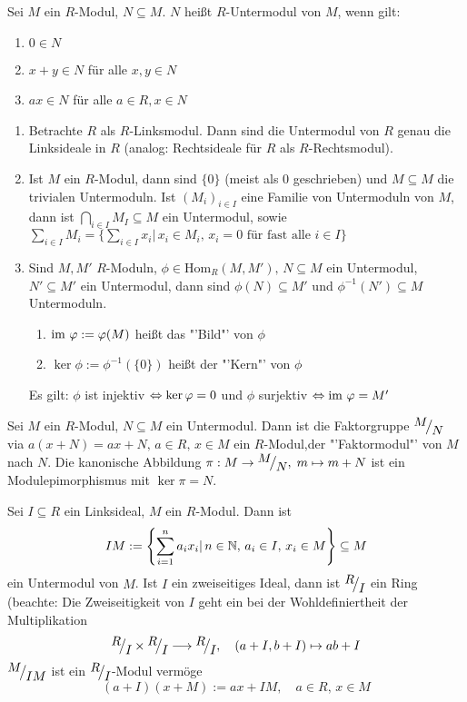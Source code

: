 \begin{df}
	Sei $M$ ein $R$-Modul, $N\subseteq M$. $N$ heißt $R$-Untermodul von $M$, wenn gilt:
	\begin{enumerate}[label= \alph*)]
		\item $0\in N$
		\item $x+y\in N$ für alle $x,y\in N$
		\item $ax\in N$ für alle $a\in R, x\in N$
	\end{enumerate}
\end{df}
\begin{bsp}
	\begin{enumerate}[label=\alph*)]
		\item Betrachte $R$ als $R$-Linksmodul. Dann sind die Untermodul von $R$ genau die Linksideale in $R$ (analog: Rechtsideale für $R$ als $R$-Rechtsmodul).
		\item Ist $M$ ein $R$-Modul, dann sind $\{0\}$ (meist als $0$ geschrieben) und $M\subseteq M$ die trivialen Untermoduln. Ist $(M_i)_{i\in I}$ eine Familie von Untermoduln von $M$, dann ist $\bigcap_{i\in I} M_I\subseteq M$ ein Untermodul, sowie $\sum_{i\in I} M_i = \{\sum_{i\in I} x_i|\, x_i \in M_i, \, x_i=0 \text{ für fast alle } i\in I\}$
		\item Sind $M, M'$ $R$-Moduln, $\phi\in \text{Hom}_R(M, M'), \, N\subseteq M$ ein Untermodul, $N' \subseteq M'$ ein Untermodul, dann sind $\phi(N) \subseteq M'$ und $\phi^{-1}(N') \subseteq M$ Untermoduln. 
		\begin{enumerate}
			\item[] $\operatorname{\text{im}\,} \varphi:= \varphi(M)$ heißt das "'Bild"' von $\phi$
			\item[] $\ker \phi:= \phi^{-1}(\{0\})$ heißt der "'Kern"' von $\phi$
		\end{enumerate}
	Es gilt: $\phi$ ist injektiv $\Leftrightarrow \ker \varphi =0$ und $\phi$ surjektiv $\Leftrightarrow \operatorname{\text{im}\,} \varphi = M'$
	\end{enumerate}
\end{bsp}
\begin{bem+df}
	Sei $M$ ein $R$-Modul, $N\subseteq M$ ein Untermodul. Dann ist die Faktorgruppe $\QR{M}{N}$ via $a(x+N) = ax+N, \, a\in R, \,x\in M$ ein $R$-Modul,der "'Faktormodul"' von $M$ nach $N$. Die kanonische Abbildung $\pi:M \to \QR{M}{N}, \; m \mapsto m+N$ ist ein Modulepimorphismus mit $\ker \pi = N$.
\end{bem+df}
\begin{bsp}
	Sei $I\subseteq R$ ein Linksideal, $M$ ein $R$-Modul. Dann ist 
	$$IM:= \left\{\sum_{i=1}^n a_i x_i|\, n\in \mathbb{N}, \, a_i \in I, \, x_i \in M\right\}\subseteq M$$
	ein Untermodul von $M$. Ist $I$ ein zweiseitiges Ideal, dann ist $\QR{R}{I}$ ein Ring (beachte: Die Zweiseitigkeit von $I$ geht ein bei der Wohldefiniertheit der Multiplikation
	$$\QR{R}{I} \times \QR{R}{I} \longrightarrow \QR{R}{I}, \quad (a+I, b+I) \mapsto ab+I$$
	$\QR{M}{IM}$ ist ein $\QR{R}{I}$-Modul vermöge
	$$(a+I)(x+M) := ax+IM, \quad a\in R, \, x\in M$$
\end{bsp}